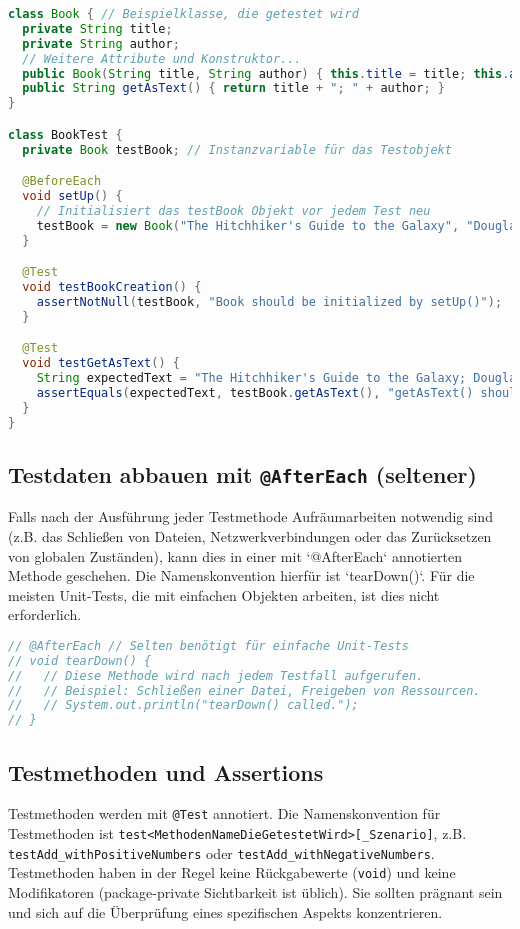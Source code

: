 \begin{lstlisting}[language=Java, caption={Verwendung von \texttt{@BeforeEach} zur Initialisierung}]
class Book { // Beispielklasse, die getestet wird
  private String title;
  private String author;
  // Weitere Attribute und Konstruktor...
  public Book(String title, String author) { this.title = title; this.author = author; }
  public String getAsText() { return title + "; " + author; }
}

class BookTest {
  private Book testBook; // Instanzvariable für das Testobjekt

  @BeforeEach
  void setUp() {
    // Initialisiert das testBook Objekt vor jedem Test neu
    testBook = new Book("The Hitchhiker's Guide to the Galaxy", "Douglas Adams");
  }

  @Test
  void testBookCreation() {
    assertNotNull(testBook, "Book should be initialized by setUp()");
  }

  @Test
  void testGetAsText() {
    String expectedText = "The Hitchhiker's Guide to the Galaxy; Douglas Adams";
    assertEquals(expectedText, testBook.getAsText(), "getAsText() should return correct format.");
  }
}
\end{lstlisting}

\subsection{Testdaten abbauen mit \texttt{@AfterEach} (seltener)}
\label{ssec:junit_aftereach}
Falls nach der Ausführung jeder Testmethode Aufräumarbeiten notwendig sind (z.B. das Schließen von Dateien, Netzwerkverbindungen oder das Zurücksetzen von globalen Zuständen), kann dies in einer mit `@AfterEach` annotierten Methode geschehen. Die Namenskonvention hierfür ist `tearDown()`. Für die meisten Unit-Tests, die mit einfachen Objekten arbeiten, ist dies nicht erforderlich.

\begin{lstlisting}[language=Java, caption={Verwendung von \texttt{@AfterEach} für Aufräumarbeiten}]
// @AfterEach // Selten benötigt für einfache Unit-Tests
// void tearDown() {
//   // Diese Methode wird nach jedem Testfall aufgerufen.
//   // Beispiel: Schließen einer Datei, Freigeben von Ressourcen.
//   // System.out.println("tearDown() called.");
// }
\end{lstlisting}

\subsection{Testmethoden und Assertions}
\label{ssec:junit_testmethoden}
Testmethoden werden mit \lstinline{@Test} annotiert. Die Namenskonvention für Testmethoden ist \lstinline{test<MethodenNameDieGetestetWird>[_Szenario]}, z.B. \lstinline{testAdd_withPositiveNumbers} oder \lstinline{testAdd_withNegativeNumbers}. Testmethoden haben in der Regel keine Rückgabewerte (\lstinline{void}) und keine Modifikatoren (package-private Sichtbarkeit ist üblich). Sie sollten prägnant sein und sich auf die Überprüfung eines spezifischen Aspekts konzentrieren.

